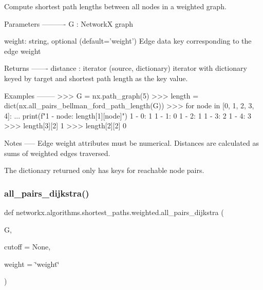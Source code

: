 \begin{DoxyVerb}Compute shortest path lengths between all nodes in a weighted graph.

Parameters
----------
G : NetworkX graph

weight: string, optional (default='weight')
    Edge data key corresponding to the edge weight

Returns
-------
distance : iterator
    (source, dictionary) iterator with dictionary keyed by target and
    shortest path length as the key value.

Examples
--------
>>> G = nx.path_graph(5)
>>> length = dict(nx.all_pairs_bellman_ford_path_length(G))
>>> for node in [0, 1, 2, 3, 4]:
...     print(f"1 - {node}: {length[1][node]}")
1 - 0: 1
1 - 1: 0
1 - 2: 1
1 - 3: 2
1 - 4: 3
>>> length[3][2]
1
>>> length[2][2]
0

Notes
-----
Edge weight attributes must be numerical.
Distances are calculated as sums of weighted edges traversed.

The dictionary returned only has keys for reachable node pairs.
\end{DoxyVerb}
 \mbox{\label{namespacenetworkx_1_1algorithms_1_1shortest__paths_1_1weighted_a2307507504e391a1bc60e53564f0066a}} 
\subsubsection{\texorpdfstring{all\+\_\+pairs\+\_\+dijkstra()}{all\_pairs\_dijkstra()}}
{\footnotesize\ttfamily def networkx.\+algorithms.\+shortest\+\_\+paths.\+weighted.\+all\+\_\+pairs\+\_\+dijkstra (\begin{DoxyParamCaption}\item[{}]{G,  }\item[{}]{cutoff = {\ttfamily None},  }\item[{}]{weight = {\ttfamily \char`\"{}weight\char`\"{}} }\end{DoxyParamCaption})}

